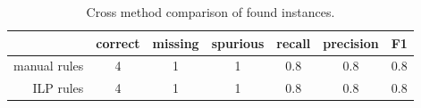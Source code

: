 \begin{table}
	\centering
	\begin{tabular}{|r|c|c|c|c|c|c|}
		\hline
		 & correct & missing & spurious & recall & precision & F1\\
		\hline
		manual rules & 4 & 1 & 1 & 0.8 & 0.8 & 0.8\\
		\hline
		ILP rules & 4 & 1 & 1 & 0.8 & 0.8 & 0.8\\
		\hline
	\end{tabular}
	\caption{Cross method comparison of found instances.}
	\label{tab:ch3_damage_cross_method}
\end{table}


